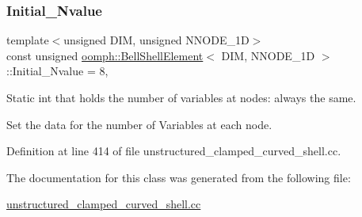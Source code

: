 \subsubsection{\texorpdfstring{Initial\+\_\+\+Nvalue}{Initial\_Nvalue}}
{\footnotesize\ttfamily template$<$unsigned D\+IM, unsigned N\+N\+O\+D\+E\+\_\+1D$>$ \\
const unsigned \hyperlink{classoomph_1_1BellShellElement}{oomph\+::\+Bell\+Shell\+Element}$<$ D\+IM, N\+N\+O\+D\+E\+\_\+1D $>$\+::Initial\+\_\+\+Nvalue = 8\hspace{0.3cm}{\ttfamily [static]}, {\ttfamily [private]}}



Static int that holds the number of variables at nodes\+: always the same. 

Set the data for the number of Variables at each node. 

Definition at line 414 of file unstructured\+\_\+clamped\+\_\+curved\+\_\+shell.\+cc.



The documentation for this class was generated from the following file\+:\begin{DoxyCompactItemize}
\item 
\hyperlink{unstructured__clamped__curved__shell_8cc}{unstructured\+\_\+clamped\+\_\+curved\+\_\+shell.\+cc}\end{DoxyCompactItemize}
